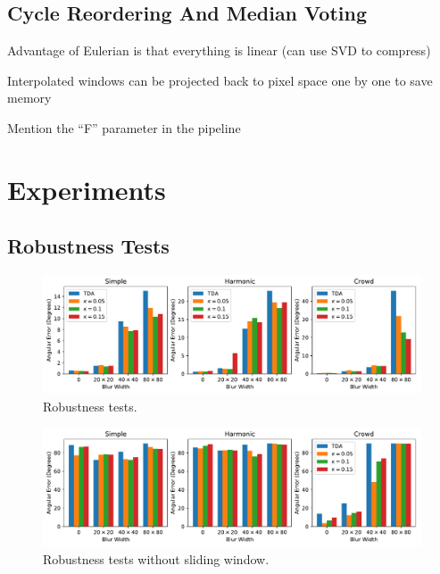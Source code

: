 \documentclass{article}
\begin{document}
\subsection{Cycle Reordering And Median Voting}
\label{sec:cyclereordering}



Advantage of Eulerian is that everything is linear (can use SVD to compress)

Interpolated windows can be projected back to pixel space one by one to save memory

Mention the ``F'' parameter in the pipeline

\section{Experiments}

\subsection{Robustness Tests}


\begin{figure}
\centering
\includegraphics[width=\columnwidth]{RobustnessTests.pdf}
\caption{Robustness tests.}
\label{fig:RobustnessTests}
\end{figure}

\begin{figure}
\centering
\includegraphics[width=\columnwidth]{RobustnessTestsNoSW.pdf}
\caption{Robustness tests without sliding window.}
\label{fig:RobustnessTestsNoSW}
\end{figure}
\end{document}
